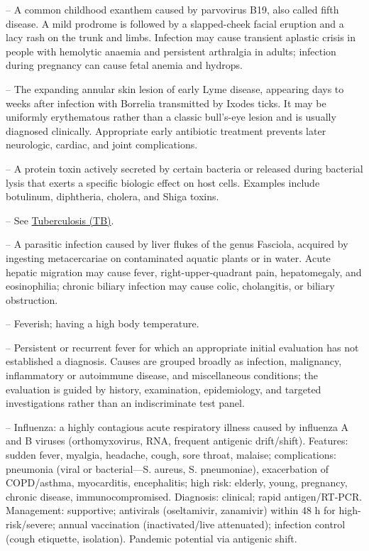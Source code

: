 -- A common childhood exanthem caused by parvovirus B19, also called fifth disease. A mild prodrome is followed by a slapped-cheek facial eruption and a lacy rash on the trunk and limbs. Infection may cause transient aplastic crisis in people with hemolytic anaemia and persistent arthralgia in adults; infection during pregnancy can cause fetal anemia and hydrops.

-- The expanding annular skin lesion of early Lyme disease, appearing days to weeks after infection with Borrelia transmitted by Ixodes ticks. It may be uniformly erythematous rather than a classic bull’s-eye lesion and is usually diagnosed clinically. Appropriate early antibiotic treatment prevents later neurologic, cardiac, and joint complications.

-- A protein toxin actively secreted by certain bacteria or released during bacterial lysis that exerts a specific biologic effect on host cells. Examples include botulinum, diphtheria, cholera, and Shiga toxins.

-- See \hyperlink{Tuberculosis (TB)}{Tuberculosis (TB)}.

-- A parasitic infection caused by liver flukes of the genus Fasciola, acquired by ingesting metacercariae on contaminated aquatic plants or in water. Acute hepatic migration may cause fever, right-upper-quadrant pain, hepatomegaly, and eosinophilia; chronic biliary infection may cause colic, cholangitis, or biliary obstruction.

-- Feverish; having a high body temperature.

-- Persistent or recurrent fever for which an appropriate initial evaluation has not established a diagnosis. Causes are grouped broadly as infection, malignancy, inflammatory or autoimmune disease, and miscellaneous conditions; the evaluation is guided by history, examination, epidemiology, and targeted investigations rather than an indiscriminate test panel.

-- Influenza: a highly contagious acute respiratory illness caused by influenza A and B viruses (orthomyxovirus, RNA, frequent antigenic drift/shift). Features: sudden fever, myalgia, headache, cough, sore throat, malaise; complications: pneumonia (viral or bacterial—S. aureus, S. pneumoniae), exacerbation of COPD/asthma, myocarditis, encephalitis; high risk: elderly, young, pregnancy, chronic disease, immunocompromised. Diagnosis: clinical; rapid antigen/RT-PCR. Management: supportive; antivirals (oseltamivir, zanamivir) within 48 h for high-risk/severe; annual vaccination (inactivated/live attenuated); infection control (cough etiquette, isolation). Pandemic potential via antigenic shift.

